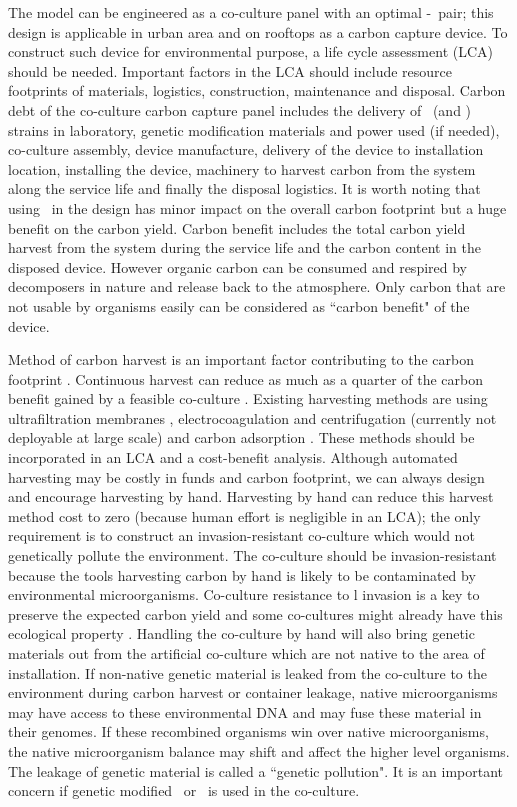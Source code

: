 \documentclass[../thesis.tex]{subfiles} %
\begin{document}
The model can be engineered as a co-culture panel with an optimal \phy-\bac\ pair; this design is applicable in urban area and on rooftops as a carbon capture device.  To construct such device for environmental purpose, a life cycle assessment (LCA) should be needed.  Important factors in the LCA should include resource footprints of materials, logistics, construction, maintenance and disposal.  Carbon debt of the co-culture carbon capture panel includes the delivery of \phy\ (and \bac) strains in laboratory, genetic modification materials and power used (if needed), co-culture assembly, device manufacture, delivery of the device to installation location, installing the device, machinery to harvest carbon from the system along the service life and finally the disposal logistics.  It is worth noting that using \bac\ in the design has minor impact on the overall carbon footprint but a huge benefit on the carbon yield.  Carbon benefit includes the total carbon yield harvest from the system during the service life and the carbon content in the disposed device.  However organic carbon can be consumed and respired by decomposers in nature and release back to the atmosphere.  Only carbon that are not usable by organisms easily can be considered as ``carbon benefit" of the device.

Method of carbon harvest is an important factor contributing to the carbon footprint \autocite{fuentes2016impact}.  Continuous harvest can reduce as much as a quarter of the carbon benefit gained by a feasible co-culture \autocite{mata2010microalgae}.  Existing harvesting methods are using ultrafiltration membranes \autocite{zhang2010harvesting}, electrocoagulation and centrifugation (currently not deployable at large scale) \autocite{wijffels2010outlook} and carbon adsorption \autocite{mata2010microalgae,wang2012novel,lee2014repeated}.  These methods should be incorporated in an LCA and a cost-benefit analysis.  Although automated harvesting may be costly in funds and carbon footprint, we can always design and encourage harvesting by hand.  Harvesting by hand can reduce this harvest method cost to zero (because human effort is negligible in an LCA); the only requirement is to construct an invasion-resistant co-culture which would not genetically pollute the environment.  The co-culture should be invasion-resistant because the tools harvesting carbon by hand is likely to be contaminated by environmental microorganisms.  Co-culture resistance to \bac l invasion is a key to preserve the expected carbon yield and some co-cultures might already have this ecological property \autocite{fuentes2016impact,seyedsayamdost2011roseobacticides}.  Handling the co-culture by hand will also bring genetic materials out from the artificial co-culture which are not native to the area of installation.  If non-native genetic material is leaked from the co-culture to the environment during carbon harvest or container leakage, native microorganisms may have access to these environmental DNA and may fuse these material in their genomes.  If these recombined organisms win over native microorganisms, the native microorganism balance may shift and affect the higher level organisms.  The leakage of genetic material is called a ``genetic pollution".  It is an important concern if genetic modified \phy\ or \bac\ is used in the co-culture.
\end{document}
